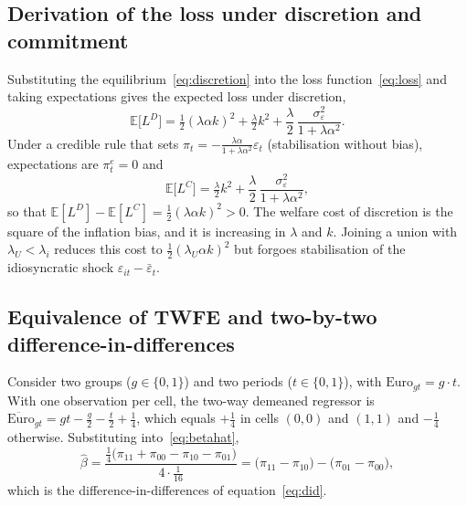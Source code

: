 \documentclass[11pt,a4paper]{article}
\numberwithin{equation}{section}
\theoremstyle{definition}
\theoremstyle{remark}
\begin{document}
\subsection{Derivation of the loss under discretion and commitment}
Substituting the equilibrium~\eqref{eq:discretion} into the loss function~\eqref{eq:loss} and taking expectations gives the expected loss under discretion,
\begin{equation}
\mathbb{E}\big[L^{D}\big] = \tfrac{1}{2}(\lambda\alpha k)^2 + \tfrac{\lambda}{2}k^2 + \frac{\lambda}{2}\,\frac{\sigma^2_\varepsilon}{1+\lambda\alpha^2}.
\end{equation}
Under a credible rule that sets $\pi_t = -\tfrac{\lambda\alpha}{1+\lambda\alpha^2}\varepsilon_t$ (stabilisation without bias), expectations are $\pi^e_t=0$ and
\begin{equation}
\mathbb{E}\big[L^{C}\big] = \tfrac{\lambda}{2}k^2 + \frac{\lambda}{2}\,\frac{\sigma^2_\varepsilon}{1+\lambda\alpha^2},
\end{equation}
so that $\mathbb{E}[L^{D}]-\mathbb{E}[L^{C}] = \tfrac{1}{2}(\lambda\alpha k)^2>0$. The welfare cost of discretion is the square of the inflation bias, and it is increasing in $\lambda$ and $k$. Joining a union with $\lambda_U<\lambda_i$ reduces this cost to $\tfrac{1}{2}(\lambda_U\alpha k)^2$ but forgoes stabilisation of the idiosyncratic shock $\varepsilon_{it}-\bar{\varepsilon}_t$.

\subsection{Equivalence of TWFE and two-by-two difference-in-differences}
Consider two groups ($g\in\{0,1\}$) and two periods ($t\in\{0,1\}$), with $\text{Euro}_{gt}=g\cdot t$. With one observation per cell, the two-way demeaned regressor is $\ddot{\text{Euro}}_{gt} = g t - \tfrac{g}{2} - \tfrac{t}{2} + \tfrac{1}{4}$, which equals $+\tfrac14$ in cells $(0,0)$ and $(1,1)$ and $-\tfrac14$ otherwise. Substituting into~\eqref{eq:betahat},
\[
\hat{\beta} = \frac{\tfrac14\big(\pi_{11}+\pi_{00}-\pi_{10}-\pi_{01}\big)}{4\cdot\tfrac1{16}}
= \big(\pi_{11}-\pi_{10}\big) - \big(\pi_{01}-\pi_{00}\big),
\]
which is the difference-in-differences of equation~\eqref{eq:did}.
\end{document}

